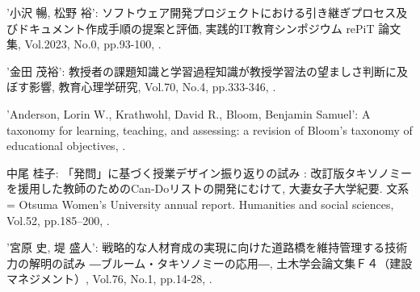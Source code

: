 \documentclass[a4paper,9pt, twocolumn]{jarticle}
\begin{document}
%
%
\begin{thebibliography}{9}
	\itemsep -1.7pt

	{\small '小沢 暢, 松野 裕':
	\newblock ソフトウェア開発プロジェクトにおける引き継ぎプロセス及びドキュメント作成手順の提案と評価,
	\newblock 実践的IT教育シンポジウム rePiT 論文集,
	\newblock Vol.2023,
	\newblock No.0,
	\newblock pp.93-100,
	.}

	{\small '金田 茂裕':
		\newblock 教授者の課題知識と学習過程知識が教授学習法の望ましさ判断に及ぼす影響,
		\newblock 教育心理学研究,
		\newblock Vol.70,
		\newblock No.4,
		\newblock pp.333-346,
		.}

	{\small 'Anderson, Lorin W., Krathwohl, David R., Bloom, Benjamin Samuel':
		\newblock A taxonomy for learning, teaching, and assessing: a revision of Bloom's taxonomy of educational objectives,
		.}

	{\small 中尾 桂子:
		\newblock「発問」に基づく授業デザイン振り返りの試み : 改訂版タキソノミーを援用した教師のためのCan-Doリストの開発にむけて,
		\newblock 大妻女子大学紀要. 文系 = Otsuma Women's University annual report. Humanities and social sciences,
		\newblock Vol.52,
		\newblock pp.185–200,
		.}

	{\small '宮原 史, 堤 盛人':
		\newblock 戦略的な人材育成の実現に向けた道路橋を維持管理する技術力の解明の試み ―ブルーム・タキソノミーの応用―,
		\newblock 土木学会論文集Ｆ４（建設マネジメント）,
		\newblock Vol.76,
		\newblock No.1,
		\newblock pp.14-28,
		.}

\end{thebibliography}
\end{document}
